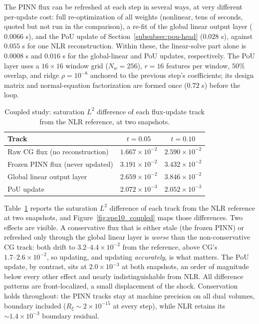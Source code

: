 \documentclass[a4paper,fleqn]{cas-sc}
\begin{document}
The PINN flux can be refreshed at each step in several ways, at very different
per-update cost: full re-optimization of all weights (nonlinear, tens of seconds,
quoted but not run in the comparison), a re-fit of the global linear output layer
(\(0.0066\) s), and the PoU update of Section~\ref{subsubsec:pou-head}
(\(0.028\) s), against \(0.055\) s for one NLR reconstruction. Within these, the
linear-solve part alone is \(0.0008\) s and \(0.016\) s for the global-linear and
PoU updates, respectively. The PoU layer uses a \(16\times16\) window grid
(\(N_w=256\)), \(r=16\) features per window, \(50\%\) overlap, and ridge
\(\rho = 10^{-8}\) anchored to the previous step's coefficients; its design matrix
and normal-equation factorization are formed once (\(0.72\) s) before the loop.

\begin{table}[!htbp]
\centering
\caption{Coupled study: saturation \(L^2\) difference of
each flux-update track from the NLR reference, at two snapshots.}
\label{tab:spe10_coupled}
\begin{tabular}{lcc}
\toprule
Track & \(t=0.05\) & \(t=0.10\) \\
\midrule
Raw CG flux (no reconstruction)  & \(1.667\times10^{-2}\) & \(2.590\times10^{-2}\) \\
Frozen PINN flux (never updated) & \(3.191\times10^{-2}\) & \(3.432\times10^{-2}\) \\
Global linear output layer       & \(2.659\times10^{-2}\) & \(3.846\times10^{-2}\) \\
PoU update                       & \(2.072\times10^{-3}\) & \(2.052\times10^{-3}\) \\
\bottomrule
\end{tabular}
\end{table}

Table~\ref{tab:spe10_coupled} reports the saturation \(L^2\)
difference of each track from the NLR reference at two snapshots, and
Figure~\ref{fig:spe10_coupled} maps those differences. Two effects are visible. A conservative flux that is either stale (the frozen
PINN) or refreshed only through the global linear layer
is \emph{worse} than the non-conservative CG track: both drift to
\(3.2\text{--}4.4\times10^{-2}\) from the reference, above CG's
\(1.7\text{--}2.6\times10^{-2}\), so updating, and updating \emph{accurately}, is
what matters. The PoU update, by contrast, sits at
\(2.0\times10^{-3}\) at both snapshots, an order of magnitude below every other
effect and nearly indistinguishable from NLR. All difference patterns are
front-localized, a small displacement of the shock. Conservation holds
throughout: the PINN tracks stay at machine precision on all dual volumes,
boundary included (\(R_\xi\sim2\times10^{-15}\) at every step), while NLR retains
its \({\sim}1.4\times10^{-3}\) boundary residual.
\end{document}
